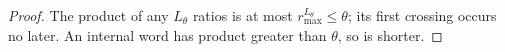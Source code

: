 \begin{proof}
The product of any $L_\theta$ ratios is at most
$r_{\max}^{L_\theta}\le\theta$; its first crossing occurs no later.
An internal word has product greater than $\theta$, so is shorter.
\end{proof}
